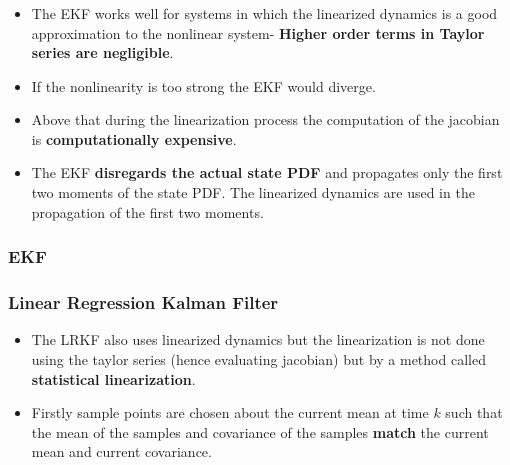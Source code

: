 \documentclass[11pt]{beamer}
\begin{document}
\begin{frame}
\frametitle{ }
\begin{itemize}[<+->]
  \item The EKF works well for systems in which the linearized dynamics is a good approximation to the nonlinear system- {\bf Higher order terms in Taylor series are negligible}. 
	\item If the nonlinearity is too strong the EKF would diverge. 
	\item Above that during the linearization process the computation of the jacobian is {\bf computationally expensive}. 
	\item The EKF {\bf disregards the actual state PDF} and propagates only the first two moments of the state PDF. The linearized dynamics are used in the propagation of the first two moments.
\end{itemize}
\end{frame}
\begin{frame}
\frametitle{EKF }



\end{frame}
\begin{frame}
\frametitle{Linear Regression Kalman Filter }

\begin{itemize}[<+->]
	\item The LRKF also uses linearized dynamics but the linearization is not done using the taylor series (hence evaluating jacobian) but by a method called {\bf statistical linearization}.
	\item Firstly sample points are chosen about the current mean at time $k$ such that the mean of the samples and covariance of the samples {\bf match} the current mean and current covariance.
	
\end{itemize}

\end{frame}
\end{document}
